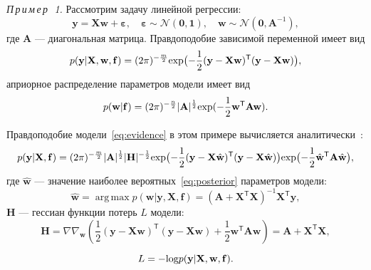 \documentclass[12pt]{a&t}
\DeclareMathOperator*{\argmax}{arg\,max}
\begin{document}
\textsl{П\,р\,и\,м\,е\,р~\,1.} Рассмотрим задачу линейной регрессии:
\[
	\mathbf{y} =\mathbf{X} \mathbf{w} + \boldsymbol{\varepsilon},\quad \boldsymbol{\varepsilon}  \sim \mathcal{N}(\mathbf{0},\mathbf{1}),\quad \mathbf{w} \sim  \mathcal{N}(\mathbf{0},\mathbf{A}^{-1}),
\]
где $\mathbf{A}$ --- диагональная матрица. 
Правдоподобие зависимой переменной имеет вид
\begin{equation}
\label{eq:example1}
	p(\mathbf{y}|  \mathbf{X}, \mathbf{w}, \mathbf{f}) = (2\pi) ^{-\frac{m}{2}} \textnormal{exp} \bigl(-\frac{1}{2}(\mathbf{y} -\mathbf{X} \mathbf{w})^\mathsf{T}(\mathbf{y} - \mathbf{X}\mathbf{w})\bigr),
\end{equation}
априорное распределение параметров модели имеет вид
\begin{equation}
\label{eq:prior}	
p(\mathbf{w}|\mathbf{f}) =  (2\pi) ^{-\frac{n}{2}} |\mathbf{A}|^{\frac{1}{2}} \textnormal{exp} (-\frac{1}{2}\mathbf{w}^\mathsf{T}\mathbf{A}\mathbf{w}).
\end{equation}

Правдоподобие модели~\eqref{eq:evidence} в этом примере вычисляется аналитически~\cite{hyperopt}:
\begin{equation}
\label{eq:ground}
	p(\mathbf{y}|\mathbf{X},\mathbf{f})  =  (2\pi) ^{-\frac{m}{2}} |\mathbf{A}|^{\frac{1}{2}} |\mathbf{H}|^{-\frac{1}{2}}  \textnormal{exp}\bigl(-\frac{1}{2}(\mathbf{y} -\mathbf{X} \hat{\mathbf{w}})^\mathsf{T}(\mathbf{y} - \mathbf{X}\hat{\mathbf{w}})\bigr)\textnormal{exp} \bigl(-\frac{1}{2}\hat{\mathbf{w}}^\mathsf{T}\mathbf{A}\hat{\mathbf{w}}\bigr),
\end{equation}
где $\hat{\mathbf{w}}$ --- значение наиболее вероятных~\eqref{eq:posterior} параметров модели:
\[
	\hat{\mathbf{w}} = \argmax p(\mathbf{w}|\mathbf{y}, \mathbf{X}, \mathbf{f}) = (\mathbf{A} + \mathbf{X}^\mathsf{T}\mathbf{X})^{-1}\mathbf{X}^\mathsf{T}\mathbf{y},
\]
$\mathbf{H}$ --- гессиан функции потерь $L$ модели:
\[
	\mathbf{H}	= \nabla \nabla_\mathbf{w} \left(\frac{1}{2} (\mathbf{y} -\mathbf{X} {\mathbf{w}})^\mathsf{T}(\mathbf{y} - \mathbf{X}{\mathbf{w}}) + \frac{1}{2}\mathbf{w}^\mathsf{T}\mathbf{A}\mathbf{w} \right) = \mathbf{A} + \mathbf{X}^\mathsf{T}\mathbf{X},
\]

\[ 
	L = - \textnormal{log} p(\mathbf{y}|  \mathbf{X}, \mathbf{w}, \mathbf{f}). 
\]
\end{document}
